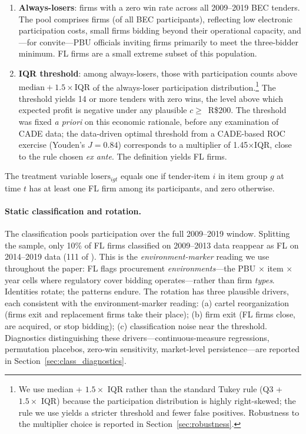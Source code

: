\begin{enumerate}
\item \textbf{Always-losers}: firms with a zero win rate across
all 2009--2019 BEC tenders. The pool comprises \valAlwaysLosers firms
(\valPctFortyone of all BEC participants), reflecting low electronic
participation costs, small firms bidding beyond their
operational capacity, and---for convite---PBU officials
inviting firms primarily to meet the three-bidder minimum. FL
firms are a small extreme subset of this population.

\item \textbf{IQR threshold}: among always-losers, those with
participation counts above $\text{median} + 1.5 \times \text{IQR}$
of the always-loser participation distribution.\footnote{We
use median + $1.5 \times$ IQR rather than the standard Tukey rule
(Q3 + $1.5 \times$ IQR) because the participation distribution
is highly right-skewed; the rule we use yields a stricter
threshold and fewer false positives. Robustness to the multiplier
choice is reported in Section~\ref{sec:robustness}.} The
threshold yields 14 or more tenders with zero wins, the level
above which expected profit is negative under any plausible
$c \geq $~R\$$200$. The threshold was fixed \emph{a priori} on
this economic rationale, before any examination of CADE data;
the data-driven optimal threshold from a CADE-based ROC
exercise (Youden's $J = 0.84$) corresponds to a multiplier of
1.45$\times$IQR, close to the rule chosen
\emph{ex ante}. The definition yields \valFL FL firms.
\end{enumerate}

The treatment variable $\text{losers}_{igt}$ equals one if
tender-item $i$ in item group $g$ at time $t$ has at least one
FL firm among its participants, and zero otherwise.

\paragraph{Static classification and rotation.}
The classification pools participation over the full 2009--2019
window. Splitting the sample, only 10\% of FL firms classified
on 2009--2013 data reappear as FL on 2014--2019 data (111 of
\valBoundaryFLone). This is the \emph{environment-marker} reading we use
throughout the paper: FL flags procurement
\emph{environments}---the PBU $\times$ item $\times$ year cells
where regulatory cover bidding operates---rather than firm
\emph{types}. Identities rotate; the patterns endure. The
rotation has three plausible drivers, each consistent with the
environment-marker reading: (a) cartel reorganization (firms
exit and replacement firms take their place); (b) firm exit (FL
firms close, are acquired, or stop bidding); (c) classification
noise near the threshold. Diagnostics distinguishing these
drivers---continuous-measure regressions, permutation placebos,
zero-win sensitivity, market-level persistence---are reported
in Section~\ref{sec:class_diagnostics}.

